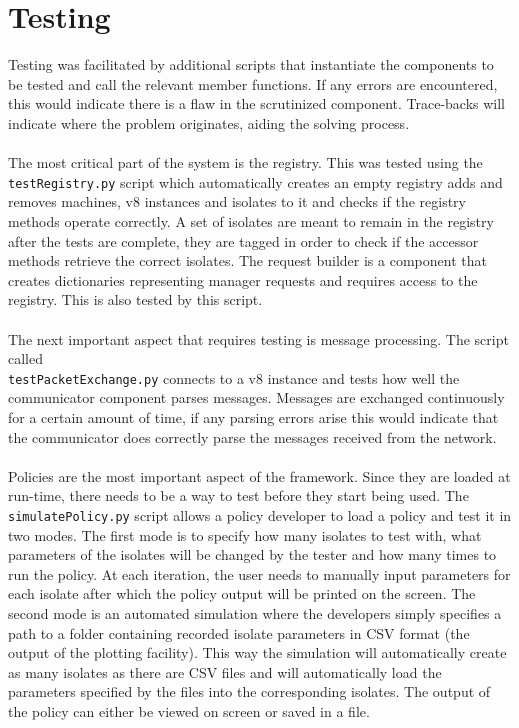\documentclass{l4proj}
\begin{document}
\section{Testing}
\hspace*{3em} Testing was facilitated by additional scripts that instantiate the components to be tested and call the relevant member functions. If any errors are encountered, this would indicate there is a flaw in the scrutinized component. Trace-backs will indicate where the problem originates, aiding the solving process. %
\\\\
\hspace*{3em} The most critical part of the system is the registry. This was tested using the \texttt{testRegistry.py} script which automatically creates an empty registry adds and removes machines, v8 instances and isolates to it and checks if the registry methods operate correctly. A set of isolates are meant to remain in the registry after the tests are complete, they are tagged in order to check if the accessor methods retrieve the correct isolates. The request builder is a component that creates dictionaries representing manager requests and requires access to the registry. This is also tested by this script. 
\\\\
\hspace*{3em} The next important aspect that requires testing is message processing. The script called \\ \texttt{testPacketExchange.py} connects to a v8 instance and tests how well the communicator component parses messages. Messages are exchanged continuously for a certain amount of time, if any parsing errors arise this would indicate that the communicator does correctly parse the messages received from the network.
\\\\
\hspace*{3em} Policies are the most important aspect of the framework. Since they are loaded at run-time, there needs to be a way to test before they start being used. The \texttt{simulatePolicy.py} script allows a policy developer to load a policy and test it in two modes. The first mode is to specify how many isolates to test with, what parameters of the isolates will be changed by the tester and how many times to run the policy. At each iteration, the user needs to manually input parameters for each isolate after which the policy output will be printed on the screen. The second mode is an automated simulation where the developers simply specifies a path to a folder containing recorded isolate parameters in CSV format (the output of the plotting facility). This way the simulation will automatically create as many isolates as there are CSV files and will automatically load the parameters specified by the files into the corresponding isolates. The output of the policy can either be viewed on screen or saved in a file.
\end{document}
